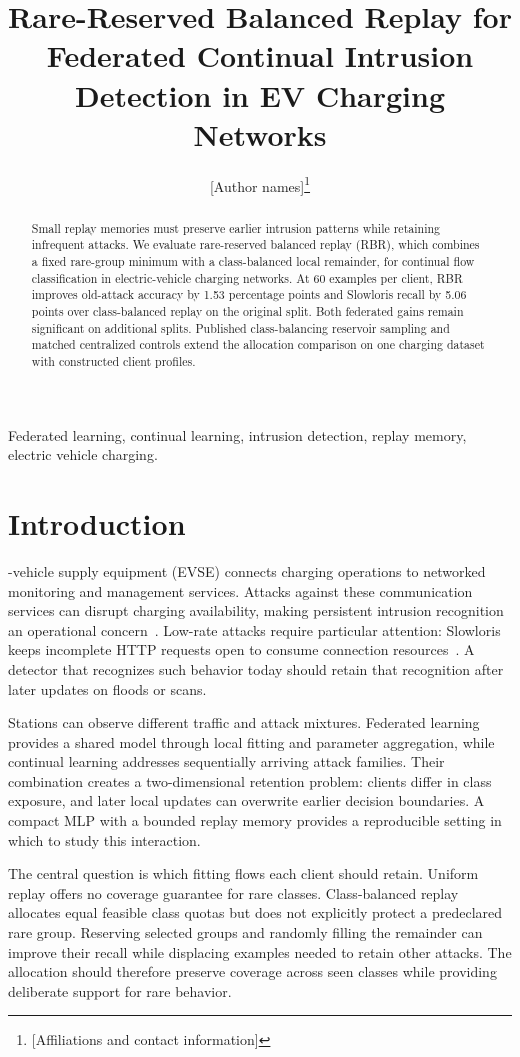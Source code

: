 \documentclass[journal,10pt]{IEEEtran}
\title{Rare-Reserved Balanced Replay for Federated Continual Intrusion Detection in EV Charging Networks}
\author{[Author names]\thanks{[Affiliations and contact information]}}
\begin{document}
\maketitle
\begin{abstract}
Small replay memories must preserve earlier intrusion patterns while retaining infrequent attacks. We evaluate rare-reserved balanced replay (RBR), which combines a fixed rare-group minimum with a class-balanced local remainder, for continual flow classification in electric-vehicle charging networks. At 60 examples per client, RBR improves old-attack accuracy by 1.53 percentage points and Slowloris recall by 5.06 points over class-balanced replay on the original split. Both federated gains remain significant on additional splits. Published class-balancing reservoir sampling and matched centralized controls extend the allocation comparison on one charging dataset with constructed client profiles.
\end{abstract}
\begin{IEEEkeywords}
Federated learning, continual learning, intrusion detection, replay memory, electric vehicle charging.
\end{IEEEkeywords}
\section{Introduction}
-vehicle supply equipment (EVSE) connects charging operations to networked monitoring and management services. Attacks against these communication services can disrupt charging availability, making persistent intrusion recognition an operational concern~\cite{ocpp,dataset}. Low-rate attacks require particular attention: Slowloris keeps incomplete HTTP requests open to consume connection resources~\cite{slowloris}. A detector that recognizes such behavior today should retain that recognition after later updates on floods or scans.

Stations can observe different traffic and attack mixtures. Federated learning provides a shared model through local fitting and parameter aggregation, while continual learning addresses sequentially arriving attack families. Their combination creates a two-dimensional retention problem: clients differ in class exposure, and later local updates can overwrite earlier decision boundaries. A compact MLP with a bounded replay memory provides a reproducible setting in which to study this interaction.

The central question is which fitting flows each client should retain. Uniform replay offers no coverage guarantee for rare classes. Class-balanced replay allocates equal feasible class quotas but does not explicitly protect a predeclared rare group. Reserving selected groups and randomly filling the remainder can improve their recall while displacing examples needed to retain other attacks. The allocation should therefore preserve coverage across seen classes while providing deliberate support for rare behavior.
\end{document}
